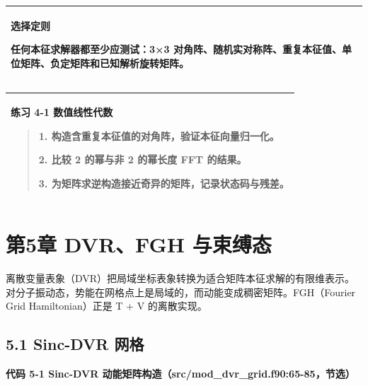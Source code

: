 \documentclass[UTF8,openany,11pt,fontset=fandol]{ctexbook}
\begin{document}
\begin{longtable}[]{@{}l@{}}
\toprule
\endhead
\begin{minipage}[t]{0.97\columnwidth}\raggedright
\textbf{选择定则}

任何本征求解器都至少应测试：3×3
对角阵、随机实对称阵、重复本征值、单位矩阵、负定矩阵和已知解析旋转矩阵。\strut
\end{minipage}\tabularnewline
\bottomrule
\end{longtable}

\begin{longtable}[]{@{}l@{}}
\toprule
\endhead
\begin{minipage}[t]{0.97\columnwidth}\raggedright
\textbf{练习 4-1 数值线性代数}

\begin{quote}
1. 构造含重复本征值的对角阵，验证本征向量归一化。

2. 比较 2 的幂与非 2 的幂长度 FFT 的结果。

3. 为矩阵求逆构造接近奇异的矩阵，记录状态码与残差。
\end{quote}\strut
\end{minipage}\tabularnewline
\bottomrule
\end{longtable}

\chapter{第5章 DVR、FGH 与束缚态}\label{ux7b2c5ux7ae0-dvrfgh-ux4e0eux675fux7f1aux6001}

离散变量表象（DVR）把局域坐标表象转换为适合矩阵本征求解的有限维表示。对分子振动态，势能在网格点上是局域的，而动能变成稠密矩阵。FGH（Fourier
Grid Hamiltonian）正是 T + V 的离散实现。

\section{\texorpdfstring{\textbf{5.1 Sinc-DVR
网格}}{5.1 Sinc-DVR 网格}}\label{sinc-dvr-ux7f51ux683c}

\textbf{代码 5-1 Sinc-DVR
动能矩阵构造（src/mod\_dvr\_grid.f90:65-85，节选）}
\end{document}
